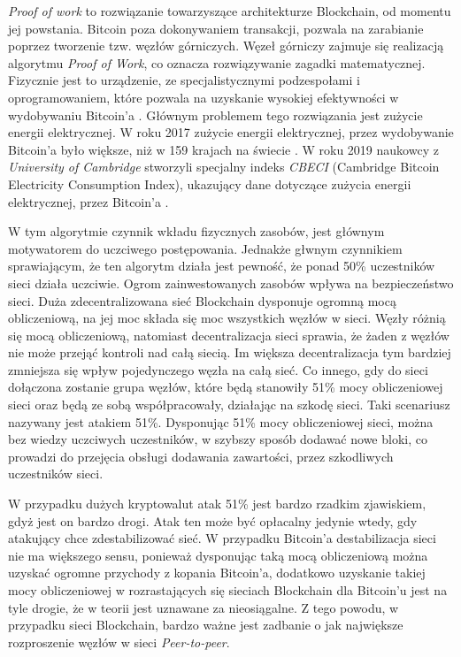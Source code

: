 \documentclass[a4paper,12pt]{book}
\begin{document}
\textit{Proof of work} to rozwiązanie towarzyszące architekturze Blockchain, od momentu jej powstania. Bitcoin poza dokonywaniem transakcji, pozwala na zarabianie poprzez tworzenie tzw. węzłów górniczych. Węzeł górniczy zajmuje się realizacją algorytmu \textit{Proof of Work}, co oznacza rozwiązywanie zagadki matematycznej. Fizycznie jest to urządzenie, ze specjalistycznymi podzespołami i oprogramowaniem, które pozwala na uzyskanie wysokiej efektywności w wydobywaniu Bitcoin'a \cite{nodes}. Głównym problemem tego rozwiązania jest zużycie energii elektrycznej. W roku 2017 zużycie energii elektrycznej, przez wydobywanie Bitcoin'a było większe, niż w 159 krajach na świecie \cite{elctricity-bitcoin}. W roku 2019 naukowcy z \textit{University of Cambridge} stworzyli specjalny indeks \textit{CBECI} (Cambridge Bitcoin Electricity Consumption Index), ukazujący dane dotyczące zużycia energii elektrycznej, przez Bitcoin'a \cite{CBECI}.

W tym algorytmie czynnik wkładu fizycznych zasobów, jest głównym motywatorem do uczciwego postępowania. Jednakże głwnym czynnikiem sprawiającym, że ten algorytm działa jest pewność, że ponad 50\% uczestników sieci działa uczciwie. Ogrom zainwestowanych zasobów wpływa na bezpieczeństwo sieci. Duża zdecentralizowana sieć Blockchain dysponuje ogromną mocą obliczeniową, na jej moc składa się moc wszystkich węzłów w sieci. Węzły różnią się mocą obliczeniową, natomiast decentralizacja sieci sprawia, że żaden z węzłów nie może przejąć kontroli nad całą siecią. Im większa decentralizacja tym bardziej zmniejsza się wpływ pojedynczego węzła na całą sieć. Co innego, gdy do sieci dołączona zostanie grupa węzłów, które będą stanowiły 51\% mocy obliczeniowej sieci oraz będą ze sobą współpracowały, działając na szkodę sieci. Taki scenariusz nazywany jest atakiem 51\%. Dysponując 51\% mocy obliczeniowej sieci, można bez wiedzy uczciwych uczestników, w szybszy sposób dodawać nowe bloki, co prowadzi do przejęcia obsługi dodawania zawartości, przez szkodliwych uczestników sieci\cite{atack51}.

W przypadku dużych kryptowalut atak 51\% jest bardzo rzadkim zjawiskiem, gdyż jest on bardzo drogi. Atak ten może być opłacalny jedynie wtedy, gdy atakujący chce zdestabilizować sieć. W przypadku Bitcoin'a destabilizacja sieci nie ma większego sensu, ponieważ dysponując taką mocą obliczeniową można uzyskać ogromne przychody z kopania Bitcoin'a, dodatkowo uzyskanie takiej mocy obliczeniowej w rozrastających się sieciach Blockchain dla Bitcoin'u jest na tyle drogie, że w teorii jest uznawane za nieosiągalne. Z tego powodu, w przypadku sieci Blockchain, bardzo ważne jest zadbanie o jak największe rozproszenie węzłów w sieci \textit{Peer-to-peer}\cite{abpow}.
\end{document}

